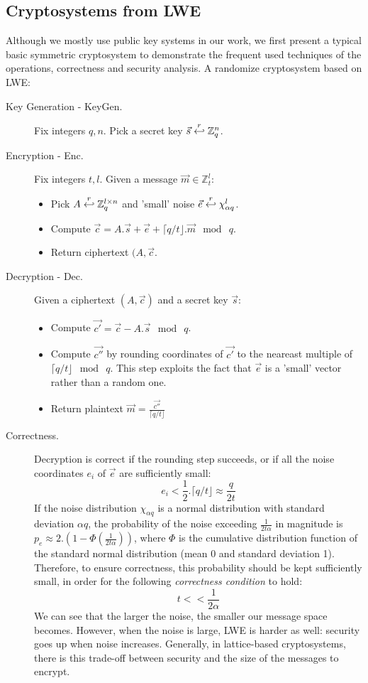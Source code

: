\subsection{Cryptosystems from LWE}
\label{sec:LWESymmetric}
Although we mostly use public key systems in our work, we first present a
typical basic symmetric cryptosystem to demonstrate the frequent used techniques
of the operations, correctness and security analysis. A randomize cryptosystem
based on LWE:
\begin{description}
\item[Key Generation - KeyGen.] Fix integers $q, n$. Pick a secret key
  $\vec{s} \stackrel{r}{\hookleftarrow} \mathbb{Z}_q^n$.
\item [Encryption - Enc.] Fix integers $t,l$. Given a message
  $\vec{m} \in \mathbb{Z}_t^l$:
  \begin{itemize}
  \item Pick $A \stackrel{r}{\hookleftarrow} \mathbb{Z}_q^{l \times n}$ and 'small' noise
    $\vec{e} \stackrel{r}{\hookleftarrow} \chi_{\alpha q}^l$.
  \item Compute
    $\vec{c} = A.\vec{s} + \vec{e} + \lceil q/t \rfloor . \vec{m} \mod \ q$.
  \item Return ciphertext $(A, \vec{c}$.
  \end{itemize}
\item [Decryption - Dec.] Given a ciphertext $(A,\vec{c})$ and a secret key
  $\vec{s}$:
  \begin{itemize}
  \item Compute $\vec{c'} = \vec{c} - A.\vec{s} \mod \ q$.
  \item Compute $\vec{c''}$ by rounding coordinates of $\vec{c'}$ to the
    neareast multiple of $\lceil q/t \rfloor \mod \ q$. This step exploits the
    fact that $\vec{e}$ is a 'small' vector rather than a random one.
  \item Return plaintext $\vec{m} = \frac{\vec{c''}}{\lceil q/t \rfloor}$
  \end{itemize}

\item [Correctness.] Decryption is correct if the rounding step succeeds, or if
  all the noise coordinates $e_i$ of $\vec{e}$ are sufficiently small:
  \[
    e_i < \frac{1}{2} . \lceil q/t \rfloor \approx \frac{q}{2t}
  \]
  If the noise distribution $\chi_{\alpha q}$ is a normal distribution with
  standard deviation $\alpha q$, the probability of the noise exceeding
  $\frac{1}{2t\alpha}$ in magnitude is
  $p_e \approx 2.\left( 1 - \Phi\left( \frac{1}{2t\alpha} \right) \right)$,
  where $\Phi$ is the cumulative distribution function of the standard normal
  distribution (mean 0 and standard deviation 1). Therefore, to ensure
  correctness, this probability should be kept sufficiently small, in order for the following
  \emph{correctness condition} to hold:
  \[
    t << \frac{1}{2\alpha}
  \]
  We can see that the larger the noise, the smaller our message space
  becomes. However, when the noise is large, LWE is harder as well: security
  goes up when noise increases.  Generally, in lattice-based cryptosystems, there
  is this trade-off between security and the size of the messages to encrypt.


\end{description}
